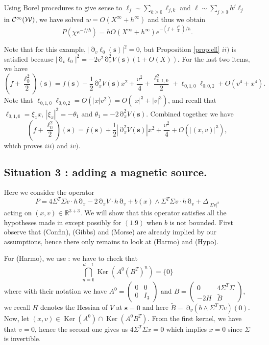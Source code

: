 \documentclass[12pt]{amsart}
\newcommand{\R}{\mathbb R}
\newcommand{\Ker}{\operatorname{Ker}}
\numberwithin{equation}{section}
\numberwithin{figure}{section}
\def\s{\mathbf{s}}
\DeclareMathOperator{\p}{\partial}
\begin{document}
Using Borel procedures to give sense to $\ell_j\sim\sum_{k\geq0}\ell_{j,k}$ and $\ell\sim\sum_{j\geq0}h^j\ell_j$ in ${\mathcal C}^\infty({\mathcal W})$, we have solved $w = O(X^\infty + h^\infty)$ and thus we obtain
\begin{equation*}
P(\chi e^{-f/h}) = hO(X^\infty + h^\infty)e^{-(f+\frac{\ell^2}{2})/h}.
\end{equation*}

Note that for this example, $|\p_v\ell_0(\s)|^2 = 0$, but Proposition \ref{prop:ell} $ii)$ is satisfied because $|\p_v\ell_0|^2 = - 2v^2\p_x^2V(\s)(1+O(X))$. For the last two items, we have
\begin{equation*}
(f+\frac{\ell_0^2}{2})(\s) = f(\s) + \frac12\p_x^2V(\s)x^2 + \frac{v^2}{4} + \frac{\ell_{0,1,0}^2}{2} + \ell_{0,1,0}\ell_{0,0,2} + O(v^4 + x^4).
\end{equation*}
Note that $\ell_{0,1,0}\ell_{0,0,2} = O(|x|v^2) = O(|x|^3 + |v|^3)$, and recall that $\ell_{0,1,0} = \xi_xx$, $|\xi_x|^2 = -\theta_1$ and $\theta_1 = -2\p_x^2V(\s)$. Combined together we have
\begin{equation*}
(f+\frac{\ell_0^2}{2})(\s) = f(\s) + \frac12|\p_x^2V(\s)|x^2 + \frac{v^2}{4} + O(|(x,v)|^3),
\end{equation*}
which proves $iii)$ and $iv)$.










\subsection{Situation 3 : adding a magnetic source.}

Here we consider the operator
\begin{equation*}
P = 4\Sigma^T\Sigma v\cdot h\p_x - 2\p_xV\cdot h\p_v + b(x)\wedge \Sigma^T\Sigma v\cdot h\p_v + \Delta_{|\Sigma v|^2}
\end{equation*}
acting on $(x,v)\in\R^{3+3}$. We will show that this operator satisfies all the hypotheses made in \cite{BoLePMi22} except possibly for $(1.9)$ when $b$ is not bounded. First observe that (Confin), (Gibbs) and (Morse) are already implied by our assumptions, hence there only remains to look at (Harmo) and (Hypo).

For (Harmo), we use \cite[Corollary 2.4 and Remark 2.5]{BoLePMi22}: we have to check that
\begin{equation*}
\bigcap_{n=0}^{d-1}\Ker(A^0(B^T)^n) = \{0\}
\end{equation*}
where with their notation we have $A^0 = \begin{pmatrix}0&0\\0&I_3\end{pmatrix}$ and $B = \begin{pmatrix}0&4\Sigma^T\Sigma\\-2H&\tilde B\end{pmatrix}$, we recall $H$ denotes the Hessian of $V$ at $\s=0$ and here $\tilde B = \p_v(b\wedge\Sigma^T\Sigma v)(0)$. Now, let $(x,v)\in\Ker(A^0)\cap\Ker(A^0B^T)$. From the first kernel, we have that $v=0$, hence the second one gives us $4\Sigma^T\Sigma x = 0$ which implies $x=0$ since $\Sigma$ is invertible.
\end{document}
